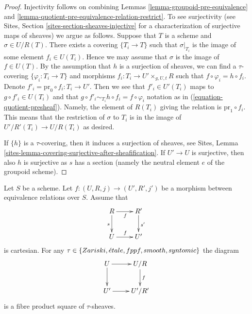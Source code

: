 \begin{proof}
Injectivity follows on combining
Lemmas \ref{lemma-groupoid-pre-equivalence} and
\ref{lemma-quotient-pre-equivalence-relation-restrict}.
To see surjectivity (see
Sites, Section \ref{sites-section-sheaves-injective}
for a characterization of surjective maps of sheaves) we argue as follows.
Suppose that $T$ is a scheme and $\sigma \in U/R(T)$.
There exists a covering $\{T_i \to T\}$ such that $\sigma|_{T_i}$
is the image of some element $f_i \in U(T_i)$. Hence we
may assume that $\sigma$ is the image of $f \in U(T)$.
By the assumption that $h$ is a surjection of sheaves, we
can find a $\tau$-covering $\{\varphi_i : T_i \to T\}$ and morphisms
$f_i : T_i \to U' \times_{g, U, t} R$ such that
$f \circ \varphi_i = h \circ f_i$. Denote
$f'_i = \text{pr}_0 \circ f_i : T_i \to U'$. Then we see that
$f'_i \in U'(T_i)$ maps to $g \circ f'_i \in U(T_i)$ and
that $g \circ f'_i \sim_{T_i} h \circ f_i = f \circ \varphi_i$
notation as in (\ref{equation-quotient-presheaf}). Namely, the
element of $R(T_i)$ giving the relation is $\text{pr}_1 \circ f_i$.
This means that the restriction
of $\sigma$ to $T_i$ is in the image of $U'/R'(T_i) \to U/R(T_i)$
as desired.

\medskip\noindent
If $\{h\}$ is a $\tau$-covering, then it induces a surjection of sheaves, see
Sites, Lemma \ref{sites-lemma-covering-surjective-after-sheafification}.
If $U' \to U$ is surjective, then also $h$ is surjective as $s$ has a section
(namely the neutral element $e$ of the groupoid scheme).
\end{proof}

\begin{lemma}
\label{lemma-criterion-fibre-product}
Let $S$ be a scheme. Let $f : (U, R, j) \to (U', R', j')$ be a morphism
between equivalence relations over $S$. Assume that
$$
\xymatrix{
R \ar[d]_s \ar[r]_f & R' \ar[d]^{s'} \\
U \ar[r]^f & U'
}
$$
is cartesian. For any
$\tau \in  \{Zariski, {\acute{e}tale}, fppf, smooth, syntomic\}$
the diagram
$$
\xymatrix{
U \ar[d] \ar[r] & U/R \ar[d]^f \\
U' \ar[r] & U'/R'
}
$$
is a fibre product square of $\tau$-sheaves.
\end{lemma}

